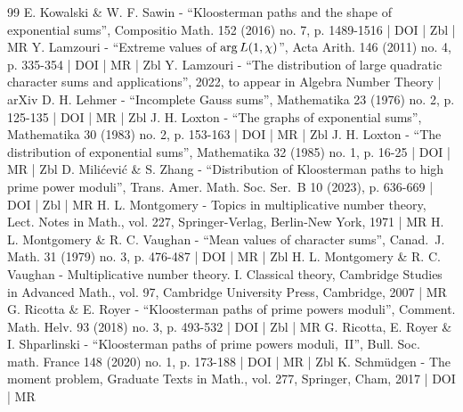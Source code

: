 \documentclass[10pt]{amsart}
\theoremstyle{plain}
\theoremstyle{definition}
\begin{document}
\begin{thebibliography}{99}
E. Kowalski \& W. F. Sawin - “Kloosterman paths and the shape of exponential sums”, Compositio Math. 152 (2016) no. 7, p. 1489-1516 | DOI | Zbl | MR
Y. Lamzouri - “Extreme values of ${\rm arg}\,L(1,\chi )$”, Acta Arith. 146 (2011) no. 4, p. 335-354 | DOI | MR | Zbl
Y. Lamzouri - “The distribution of large quadratic character sums and applications”, 2022, to appear in Algebra Number Theory | arXiv
D. H. Lehmer - “Incomplete Gauss sums”, Mathematika 23 (1976) no. 2, p. 125-135 | DOI | MR | Zbl
J. H. Loxton - “The graphs of exponential sums”, Mathematika 30 (1983) no. 2, p. 153-163 | DOI | MR | Zbl
J. H. Loxton - “The distribution of exponential sums”, Mathematika 32 (1985) no. 1, p. 16-25 | DOI | MR | Zbl
D. Milićević \& S. Zhang - “Distribution of Kloosterman paths to high prime power moduli”, Trans. Amer. Math. Soc. Ser. B 10 (2023), p. 636-669 | DOI | Zbl | MR
H. L. Montgomery - Topics in multiplicative number theory, Lect. Notes in Math., vol. 227, Springer-Verlag, Berlin-New York, 1971 | MR
H. L. Montgomery \& R. C. Vaughan - “Mean values of character sums”, Canad. J. Math. 31 (1979) no. 3, p. 476-487 | DOI | MR | Zbl
H. L. Montgomery \& R. C. Vaughan - Multiplicative number theory. I. Classical theory, Cambridge Studies in Advanced Math., vol. 97, Cambridge University Press, Cambridge, 2007 | MR
G. Ricotta \& E. Royer - “Kloosterman paths of prime powers moduli”, Comment. Math. Helv. 93 (2018) no. 3, p. 493-532 | DOI | Zbl | MR
G. Ricotta, E. Royer \& I. Shparlinski - “Kloosterman paths of prime powers moduli, II”, Bull. Soc. math. France 148 (2020) no. 1, p. 173-188 | DOI | MR | Zbl
K. Schmüdgen - The moment problem, Graduate Texts in Math., vol. 277, Springer, Cham, 2017 | DOI | MR
\end{thebibliography}
\end{document}
